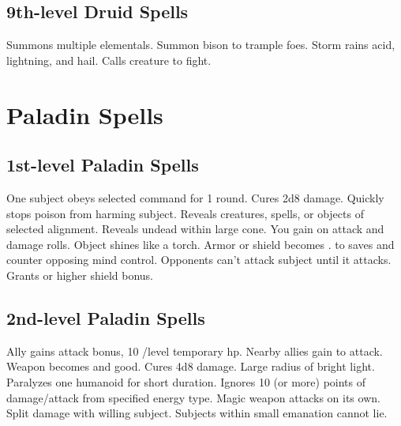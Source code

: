 \subsection{9th-level Druid Spells}
\begin{spelllist}
   Summons multiple elementals.
   Summon bison to trample foes.
   Storm rains acid, lightning, and hail.
   Calls creature to fight.
\end{spelllist}

\section{Paladin Spells}  

\subsection{1st-level Paladin Spells}
\begin{spelllist}
   One subject obeys selected command for 1 round.
   Cures 2d8 damage.
   Quickly stops poison from harming subject.
   Reveals creatures, spells, or objects of selected alignment.
   Reveals undead within large cone.
   You gain  on attack and damage rolls.
   Object shines like a torch.
   Armor or shield becomes .
    to saves and counter opposing mind control.
   Opponents can't attack subject until it attacks.
   Grants  or higher shield bonus.
\end{spelllist}

\subsection{2nd-level Paladin Spells}
\begin{spelllist}
   Ally gains  attack bonus, 10 /level temporary hp.
   Nearby allies gain  to attack.
   Weapon becomes  and good.
   Cures 4d8 damage.
   Large radius of bright light.
   Paralyzes one humanoid for short duration.
   Ignores 10 (or more) points of damage/attack from specified energy type.
   Magic weapon attacks on its own.
   Split damage with willing subject.
   Subjects within small emanation cannot lie.
\end{spelllist}

